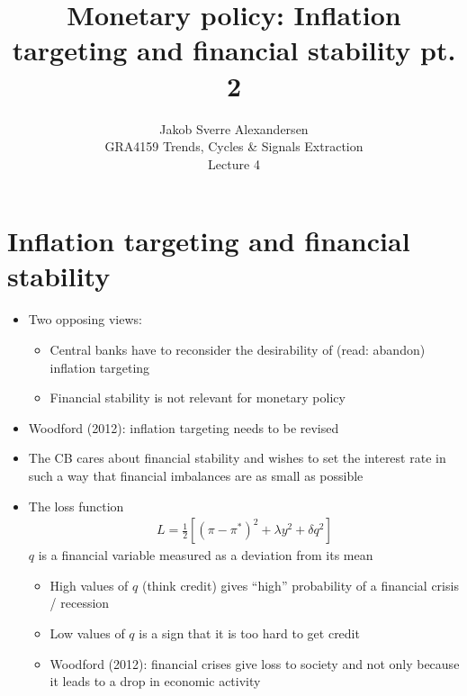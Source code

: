 \documentclass[10pt]{article}
\begin{document}
 
\title{Monetary policy: Inflation targeting and financial stability pt. 2}
\author{Jakob Sverre Alexandersen\\
GRA4159 Trends, Cycles \& Signals Extraction\\
Lecture 4}
\maketitle

\tableofcontents
\newpage
\section{Inflation targeting and financial stability}
\begin{itemize}
    \item Two opposing views: 
    \begin{itemize}
        \item Central banks have to reconsider the desirability of (read: abandon) inflation targeting 
        \item Financial stability is not relevant for monetary policy
    \end{itemize}
    \item Woodford (2012): inflation targeting needs to be revised
    \item The CB cares about financial stability and wishes to set the interest rate in such a way that financial imbalances are as small as possible
    \item The loss function 
    \begin{gather*}
        L = \frac{1}{2}\left[(\pi - \pi^*)^2 + \lambda y^2 + \delta q^2\right]
    \end{gather*}
    $q $ is a financial variable measured as a deviation from its mean 
    \begin{itemize}
        \item High values of $q $ (think credit) gives ``high'' probability of a financial crisis / recession 
        \item Low values of $q $ is a sign that it is too hard to get credit 
        \item Woodford (2012): financial crises give loss to society and not only because it leads to a drop in economic activity
    \end{itemize}
\end{itemize}
\end{document}
